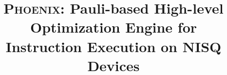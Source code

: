 \documentclass[conference]{IEEEtran}
\newcommand{\phoenix}{\textsc{Phoenix}}
\begin{document}

\title{\phoenix: Pauli-based High-level Optimization Engine for Instruction Execution on NISQ Devices}






    






\maketitle
\end{document}
